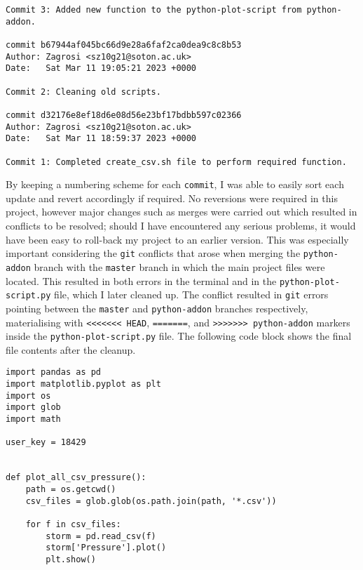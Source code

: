 \documentclass[]{article}
\begin{document}
\begin{verbatim}
Commit 3: Added new function to the python-plot-script from python-addon.

commit b67944af045bc66d9e28a6faf2ca0dea9c8c8b53
Author: Zagrosi <sz10g21@soton.ac.uk>
Date:   Sat Mar 11 19:05:21 2023 +0000

Commit 2: Cleaning old scripts.

commit d32176e8ef18d6e08d56e23bf17bdbb597c02366
Author: Zagrosi <sz10g21@soton.ac.uk>
Date:   Sat Mar 11 18:59:37 2023 +0000

Commit 1: Completed create_csv.sh file to perform required function.
    \end{verbatim}

    By keeping a numbering scheme for each \verb|commit|, I was able to easily sort each update and revert accordingly if required. No reversions were required in this project, however major changes such as merges were carried out which resulted in conflicts to be resolved; should I have encountered any serious problems, it would have been easy to roll-back my project to an earlier version. This was especially important considering the \verb|git| conflicts that arose when merging the \verb|python-addon| branch with the \verb|master| branch in which the main project files were located. This resulted in both errors in the terminal and in the \verb|python-plot-script.py| file, which I later cleaned up. The conflict resulted in \verb|git| errors pointing between the \verb|master| and \verb|python-addon| branches respectively, materialising with \verb|<<<<<<< HEAD|, \verb|=======|, and \verb|>>>>>>> python-addon| markers inside the \verb|python-plot-script.py| file. The following code block shows the final file contents after the cleanup.
    \begin{verbatim}
import pandas as pd
import matplotlib.pyplot as plt
import os
import glob
import math

user_key = 18429


def plot_all_csv_pressure():
    path = os.getcwd()
    csv_files = glob.glob(os.path.join(path, '*.csv'))

    for f in csv_files:
        storm = pd.read_csv(f)
        storm['Pressure'].plot()
        plt.show()

    \end{verbatim}
\end{document}
